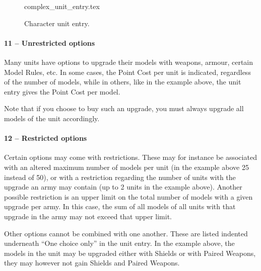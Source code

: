 \newcommand{\wickedwitch}{Wicked Witch}
\newcommand{\hydrophobe}{Hydrophobe}
\newcommand{\hydrophobedef}{%
	If the model touches a Water Terrain Feature, it is immediately removed as a casualty.%
}
\newcommand{\redrubberboots}{Red Rubber Boots}
\newcommand{\redrubberbootsdef}{%
	The model loses the \hydrophobe{} Model Rule and gains \strider{} (Water Terrain).%
}
\newcommand{\witchesbroom}{Witches' Broom}
\newcommand{\wingedmonkeychariot}{Winged Monkey Chariot}

\begin{figure}[!b]
	\centering
	{complex_unit_entry.tex}\vspace{-5pt}
	\caption{Character unit entry.}
	\label{figure/complex_unit_entry}
\end{figure}

\columnbreak

\paragraph{11 -- Unrestricted options}

Many units have options to upgrade their models with weapons, armour, certain Model Rules, etc. In some cases, the Point Cost per unit is indicated, regardless of the number of models, while in others, like in the example above, the unit entry gives the Point Cost per model.

Note that if you choose to buy such an upgrade, you must always upgrade all models of the unit accordingly.

\paragraph{12 -- Restricted options}

Certain options may come with restrictions. These may for instance be associated with an altered maximum number of models per unit (in the example above 25 instead of 50), or with a restriction regarding the number of units with the upgrade an army may contain (up to 2 units in the example above). Another possible restriction is an upper limit on the total number of models with a given upgrade per army. In this case, the sum of all models of all units with that upgrade in the army may not exceed that upper limit.

Other options cannot be combined with one another. These are listed indented underneath \enquote{One choice only} in the unit entry. In the example above, the models in the unit may be upgraded either with Shields or with Paired Weapons, they may however not gain Shields and Paired Weapons.

